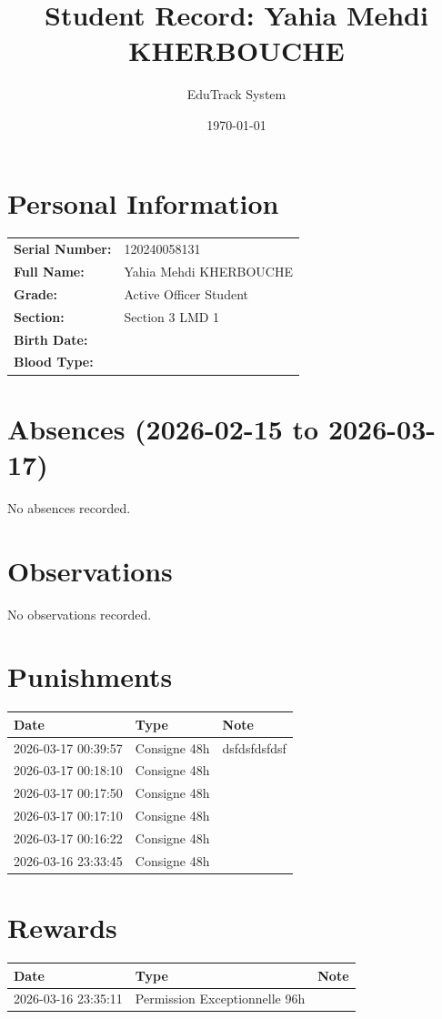 \documentclass[a4paper,12pt]{article}
\title{Student Record: Yahia Mehdi KHERBOUCHE}
\author{EduTrack System}
\date{\today}
\begin{document}
\maketitle

\section*{Personal Information}
\begin{tabular}{ll}
\textbf{Serial Number:} & 120240058131 \\
\textbf{Full Name:} & Yahia Mehdi KHERBOUCHE \\
\textbf{Grade:} & Active Officer Student \\
\textbf{Section:} & Section 3 LMD 1 \\
\textbf{Birth Date:} &  \\
\textbf{Blood Type:} &  \\
\end{tabular}

\section*{Absences (2026-02-15 to 2026-03-17)}
No absences recorded.
\section*{Observations}
No observations recorded.
\section*{Punishments}
\begin{tabular}{lll}
\hline \textbf{Date} & \textbf{Type} & \textbf{Note} \\ \hline
2026-03-17 00:39:57 & Consigne 48h & dsfdsfdsfdsf \\
2026-03-17 00:18:10 & Consigne 48h &  \\
2026-03-17 00:17:50 & Consigne 48h &  \\
2026-03-17 00:17:10 & Consigne 48h &  \\
2026-03-17 00:16:22 & Consigne 48h &  \\
2026-03-16 23:33:45 & Consigne 48h &  \\
\hline
\end{tabular}

\section*{Rewards}
\begin{tabular}{lll}
\hline \textbf{Date} & \textbf{Type} & \textbf{Note} \\ \hline
2026-03-16 23:35:11 & Permission Exceptionnelle 96h &  \\
\hline
\end{tabular}
\end{document}
